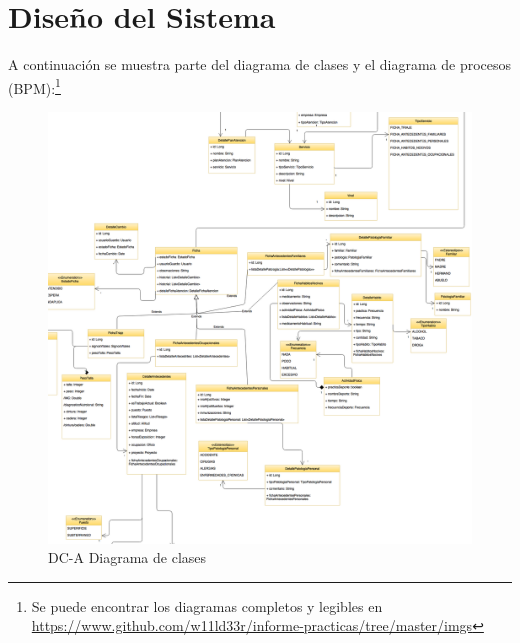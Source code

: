 	\newpage
	\section{Diseño del Sistema}
		A continuación se muestra parte del diagrama de clases y el diagrama de
		procesos (BPM):\footnote{Se puede encontrar los diagramas completos y legibles
		en
		\href{https://www.github.com/w11ld33r/informe-practicas/tree/master/imgs}{https://www.github.com/w11ld33r/informe-practicas/tree/master/imgs}}

		\begin{figure}[H]
		    \centering
			\includegraphics[width=17cm]{../imgs/disenio/DC2.png}
			\caption{DC-A Diagrama de clases}
		\end{figure}
